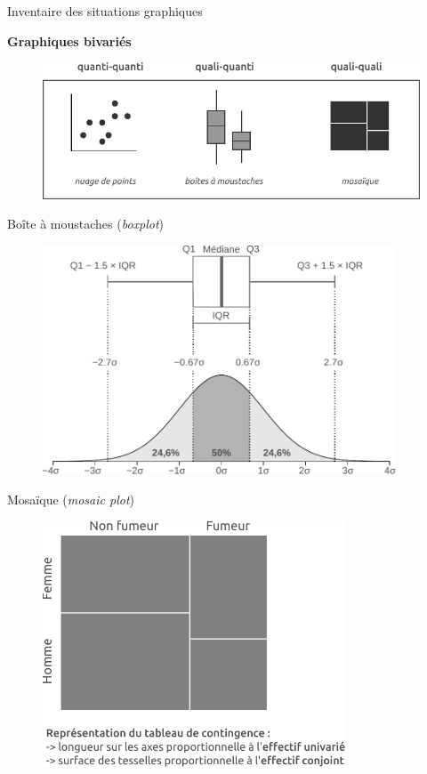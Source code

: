 \begin{frame}{Inventaire des situations graphiques}

\textbf{Graphiques bivariés}

\begin{figure}
\includegraphics[width=11.5cm]{TableauGraphique2.pdf}
\end{figure}

\end{frame}


\begin{frame}{Boîte à moustaches (\textit{boxplot})}


\begin{figure}
\includegraphics[width=10.5cm]{Boxplot.pdf}
\end{figure}

\end{frame}


\begin{frame}{Mosaïque (\textit{mosaic plot})}

\begin{figure}
\includegraphics[width=9cm]{Mosaique.pdf}
\end{figure}

\end{frame}


